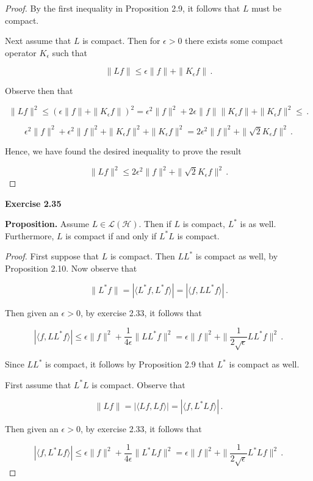 \documentclass[a4paper]{article}
\numberwithin{equation}{section}
\begin{document}
\begin{description}
\begin{proof}
By the first inequality in Proposition 2.9, it follows that $L$ must be compact.

Next assume that $L$ is compact. Then for $\epsilon > 0$ there exists some compact operator $K_\epsilon$ such that 

$$\|Lf\| \leq \epsilon\|f\| + \|K_\epsilon f\|\,.$$

Observe then that

$$\|Lf\|^2 \leq \left(\epsilon\|f\| + \|K_\epsilon f\|\right)^2 = \epsilon^2\|f\|^2 + 2\epsilon
\|f\|\|K_\epsilon f\| + \|K_\epsilon f\|^2 \leq \,.$$ 

$$\epsilon^2\|f\|^2 + \epsilon^2\|f\|^2 + \|K_\epsilon f\|^2 + \|K_\epsilon f\|^2 = 2\epsilon^2\|f\|^2 + \|\sqrt{2}K_\epsilon f\|^2\,.$$

Hence, we have found the desired inequality to prove the result

$$\|Lf\|^2 \leq 2\epsilon^2\|f\|^2 + \|\sqrt{2}K_\epsilon f\|^2\,.$$

\end{proof}

\item \textbf{Exercise 2.35}

\item \textbf{Proposition.} Assume $L \in \mathcal{L}(\mathcal{H})$. Then if $L$ is compact, $L^*$ is as well. Furthermore, $L$ is compact if and only if $L^*L$ is compact.

\item \begin{proof} First suppose that $L$ is compact. Then $LL^*$ is compact as well, by Proposition 2.10. Now observe that

$$\|L^*f\| = |\langle L^*f,L^*f \rangle| = |\langle f,LL^*f\rangle|\,.$$

Then given an $\epsilon > 0$, by exercise 2.33, it follows that

$$|\langle f,LL^*f\rangle| \leq \epsilon\|f\|^2 + \frac{1}{4\epsilon} \|LL^*f\|^2 = \epsilon\|f\|^2 +  \|\frac{1}{2\sqrt{\epsilon}}LL^*f\|^2\,.$$

Since $LL^*$ is compact, it follows by Proposition 2.9 that $L^*$ is compact as well.

First assume that $L^*L$ is compact. Observe that

$$\|Lf\| = |\langle Lf,Lf \rangle| = |\langle f,L^*Lf\rangle|\,.$$

Then given an $\epsilon > 0$, by exercise 2.33, it follows that

$$|\langle f,L^*Lf\rangle| \leq \epsilon\|f\|^2 + \frac{1}{4\epsilon} \|L^*Lf\|^2 = \epsilon\|f\|^2 +  \|\frac{1}{2\sqrt{\epsilon}}L^*Lf\|^2\,.$$


\end{proof}
\end{description}
\end{document}
